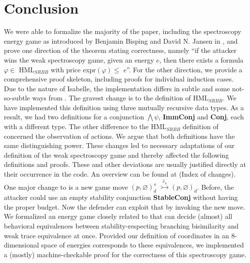 \section{Conclusion}
We were able to formalize the majority of the paper, including the spectroscopy energy game as introduced by Benjamin Bisping and David N. Jansen in \cite{bisping2023lineartimebranchingtime}, 
and prove one direction of the theorem stating correctness, namely ``if the attacker wins the weak spectroscopy game, given an energy $e$, then there exists a formula $\varphi \in$ HML$_{SRBB}$ with price expr$(\varphi) \leq$ $e$''. 
For the other direction, we provide a comprehensive proof skeleton, including proofs for individual induction cases.
\\
Due to the nature of Isabelle, the implementation differs in subtle and some not-so-subtle ways from \cite{bisping2023lineartimebranchingtime}. The gravest change is to the definition of HML$_{SRBB}$. 
We have implemented this definition using three mutually recursive data types. As a result, we had two definitions for a conjunction $\bigwedge\psi$, \textbf{ImmConj} and \textbf{Conj}, each with a different type. 
The other difference to the HML$_{SRBB}$ definition of \cite{bisping2023lineartimebranchingtime} concerned the observation of actions. 
We argue that both definitions have the same distinguishing power. 
These changes led to necessary adaptations of our definition of the weak spectroscopy game and thereby affected the following definitions and proofs.
These and other deviations are usually justified directly at their occurrence in the code. An overview can be found at (Index of changes). 
\\
One major change to \cite{bisping2023lineartimebranchingtime} is a new game move $(p,\varnothing)_{d}^{s}$ $\overset{\hat{e}_4}{\rightarrowtail} (p,\varnothing)_d$. 
Before, the attacker could use an empty stability conjunction \textbf{StableConj} without having the proper budget. Now the defender can exploit that by invoking the new move.
\\
We formalized an energy game closely related to \cite{bisping2023lineartimebranchingtime} that can decide (almost) all behavioral equivalences between stability-respecting branching bisimilarity and weak trace equivalence at once.
Provided our definition of coordinates in an 8-dimensional space of energies corresponds to these equivalences, we implemented a (mostly) machine-checkable proof for the correctness of this spectroscopy game.